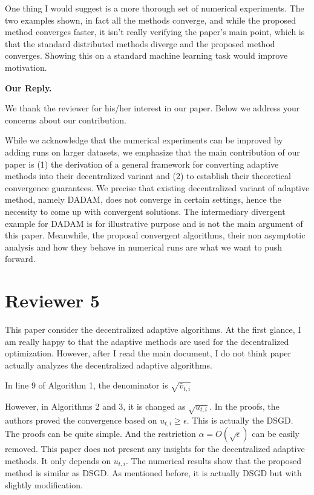 \documentclass{article} %
\begin{document}
One thing I would suggest is a more thorough set of numerical experiments. The two examples shown, in fact all the methods converge, and while the proposed method converges faster, it isn't really verifying the paper's main point, which is that the standard distributed methods diverge and the proposed method converges. Showing this on a standard machine learning task would improve motivation.


\textbf{Our Reply.}

We thank the reviewer for his/her interest in our paper. Below we address your concerns about our contribution. 

While we acknowledge that the numerical experiments can be improved by adding runs on larger datasets, we emphasize that the main contribution of our paper is (1) the derivation of a general framework for converting adaptive methods into their decentralized variant and (2) to establish their theoretical convergence guarantees.
We precise that existing decentralized variant of adaptive method, namely DADAM, does not converge in certain settings, hence the necessity to come up with convergent solutions.
The intermediary divergent example for DADAM is for illustrative purpose and is not the main argument of this paper.
Meanwhile, the proposal convergent algorithms, their non asymptotic analysis and how they behave in numerical runs are what we want to push forward.



\section{Reviewer 5}
\vspace{-0.1in}

This paper consider the decentralized adaptive algorithms. At the first glance, I am really happy to that the adaptive methods are used for the decentralized optimization. However, after I read the main document, I do not think paper actually analyzes the decentralized adaptive algorithms.

In line 9 of Algorithm 1, the denominator is $\sqrt{\hat{v}_{t,i}}$

However, in Algorithms 2 and 3, it is changed as $\sqrt{u_{t,i}}$. In the proofs, the authors proved the convergence based on $u_{t,i}\geq \epsilon$. 
This is actually the DSGD. The proofs can be quite simple. 
And the restriction $\alpha=O(\sqrt{\epsilon})$ can be easily removed. This paper does not present any insights for the decentralized adaptive methods. It only depends on $u_{t,i}$. The numerical results show that the proposed method is similar as DSGD. As mentioned before, it is actually DSGD but with slightly modification.
\end{document}
